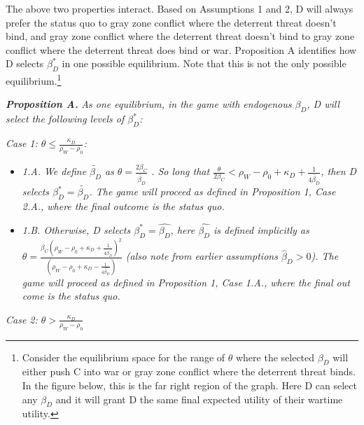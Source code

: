 \documentclass[
]{article}
\begin{document}
The above two properties interact. Based on Assumptions 1 and 2, D will always prefer the status quo to gray zone conflict where the deterrent threat doesn't bind, and gray zone conflict where the deterrent threat doesn't bind to gray zone conflict where the deterrent threat does bind or war. Proposition A identifies how D selects \(\beta_{D}^{*}\) in one possible equilibrium. Note that this is not the only possible equilibrium.\footnote{Consider the equilibrium space for the range of $\theta$ where the selected $\beta_{D}$ will either push C into war or gray zone conflict where the deterrent threat binds. In the figure below, this is the far right region of the graph. Here D can select any $\beta_{D}$ and it will grant D the same final expected utility of their wartime utility.}

\textbf{\textit{Proposition A.}}\textit{ As one equilibrium, in the game with endogenous $\beta_{D}$, D will select the following levels of $\beta_{D}^{*}$:}

\textit{Case 1: $\theta\leq\frac{\kappa_{D}}{\rho_{W}-\rho_{0}}$:}

\begin{itemize}
  \item \textit{1.A. We define $\tilde{\beta_{D}}$ as $\theta=\frac{2\beta_{C}}{\tilde{\beta_{D}}}$ . So long that $\frac{\theta}{2\beta_{C}}<\rho_{W}-\rho_{0}+\kappa_{D}+\frac{1}{4\tilde{\beta_{D}}}$, then D selects $\beta_{D}^{*}=\tilde{\beta_{D}}$. The game will proceed as defined in Proposition 1, Case 2.A., where the final outcome is the status quo.} 
  \item \textit{1.B. Otherwise, D selects $\beta_{D}^{*}=\hat{\beta_{D}}$, here $\hat{\beta_{D}}$ is defined implicitly as $\theta=\frac{\beta_{C}\left(\rho_{W}-\rho_{0}+\kappa_{D}+\frac{1}{4\hat{\beta_{D}}}\right)^{2}}{\left(\rho_{W}-\rho_{0}+\kappa_{D}-\frac{1}{4\hat{\beta_{D}}}\right)}$ (also note from earlier assumptions $\hat{\beta}_{D}>0$). The game will proceed as defined in Proposition 1, Case 1.A., where the final out come is the status quo.} 
  \end{itemize}

\textit{Case 2: $\theta>\frac{\kappa_{D}}{\rho_{W}-\rho_{0}}$}
\end{document}
